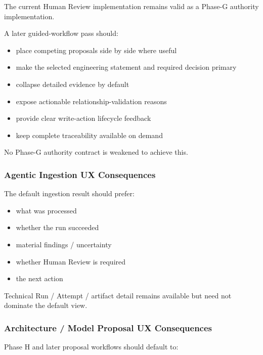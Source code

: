The current Human Review implementation remains valid as a Phase-G authority implementation.

A later guided-workflow pass should:

\begin{itemize}
\tightlist
\item
  place competing proposals side by side where useful
\item
  make the selected engineering statement and required decision primary
\item
  collapse detailed evidence by default
\item
  expose actionable relationship-validation reasons
\item
  provide clear write-action lifecycle feedback
\item
  keep complete traceability available on demand
\end{itemize}

No Phase-G authority contract is weakened to achieve this.

\hypertarget{agentic-ingestion-ux-consequences}{%
\subsubsection{Agentic Ingestion UX Consequences}\label{agentic-ingestion-ux-consequences}}

The default ingestion result should prefer:

\begin{itemize}
\tightlist
\item
  what was processed
\item
  whether the run succeeded
\item
  material findings / uncertainty
\item
  whether Human Review is required
\item
  the next action
\end{itemize}

Technical Run / Attempt / artifact detail remains available but need not dominate the default view.

\hypertarget{architecture--model-proposal-ux-consequences}{%
\subsubsection{Architecture / Model Proposal UX Consequences}\label{architecture--model-proposal-ux-consequences}}

Phase H and later proposal workflows should default to:

